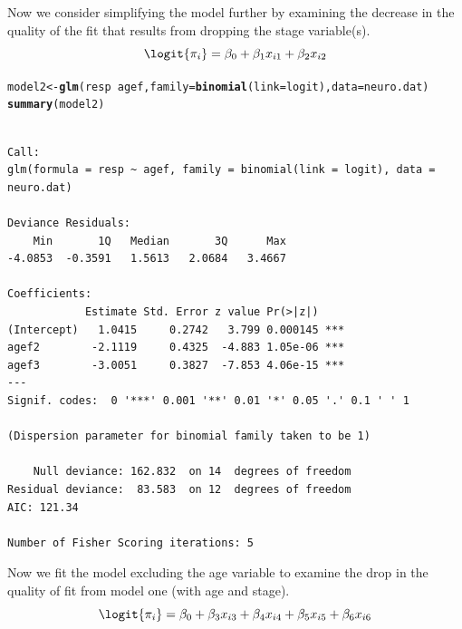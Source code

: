 \documentclass[oneside]{book}\usepackage[]{graphicx}\usepackage[svgnames]{xcolor}
\makeatletter
\newcommand{\hlopt}[1]{\textcolor[rgb]{0,0,0}{#1}}%
\newcommand{\hlstd}[1]{\textcolor[rgb]{0.345,0.345,0.345}{#1}}%
\newcommand{\hlkwb}[1]{\textcolor[rgb]{0.69,0.353,0.396}{#1}}%
\newcommand{\hlkwc}[1]{\textcolor[rgb]{0.333,0.667,0.333}{#1}}%
\newcommand{\hlkwd}[1]{\textcolor[rgb]{0.737,0.353,0.396}{\textbf{#1}}}%
\newenvironment{kframe}{%
 \def\at@end@of@kframe{}%
 \ifinner\ifhmode%
  \def\at@end@of@kframe{\end{minipage}}%
  \begin{minipage}{\columnwidth}%
 \fi\fi%
 \def\FrameCommand##1{\hskip\@totalleftmargin \hskip-\fboxsep
 \colorbox{shadecolor}{##1}\hskip-\fboxsep
     \hskip-\linewidth \hskip-\@totalleftmargin \hskip\columnwidth}%
 \MakeFramed {\advance\hsize-\width
   \@totalleftmargin\z@ \linewidth\hsize
   \@setminipage}}%
 {\par\unskip\endMakeFramed%
 \at@end@of@kframe}
\newenvironment{knitrout}{}{} %
\makeatother
\begin{document}
Now we consider simplifying the model further by examining the decrease in the quality
of the fit that results from dropping the stage variable(s).
\[ \logit{\pi_i}=\beta_0+\beta_1x_{i1}+\beta_2x_{i2} \]
\begin{knitrout}
\color{fgcolor}\begin{kframe}
\begin{alltt}
\hlstd{model2} \hlkwb{<-} \hlkwd{glm}\hlstd{(resp} \hlopt{~} \hlstd{agef,} \hlkwc{family} \hlstd{=} \hlkwd{binomial}\hlstd{(}\hlkwc{link} \hlstd{= logit),} \hlkwc{data} \hlstd{= neuro.dat)}
\hlkwd{summary}\hlstd{(model2)}
\end{alltt}
\begin{verbatim}

Call:
glm(formula = resp ~ agef, family = binomial(link = logit), data = neuro.dat)

Deviance Residuals: 
    Min       1Q   Median       3Q      Max  
-4.0853  -0.3591   1.5613   2.0684   3.4667  

Coefficients:
            Estimate Std. Error z value Pr(>|z|)    
(Intercept)   1.0415     0.2742   3.799 0.000145 ***
agef2        -2.1119     0.4325  -4.883 1.05e-06 ***
agef3        -3.0051     0.3827  -7.853 4.06e-15 ***
---
Signif. codes:  0 '***' 0.001 '**' 0.01 '*' 0.05 '.' 0.1 ' ' 1

(Dispersion parameter for binomial family taken to be 1)

    Null deviance: 162.832  on 14  degrees of freedom
Residual deviance:  83.583  on 12  degrees of freedom
AIC: 121.34

Number of Fisher Scoring iterations: 5
\end{verbatim}
\end{kframe}
\end{knitrout}
Now we fit the model excluding the age variable to examine the drop in the quality of
fit from model one (with age and stage).
\[ \logit{\pi_i}=\beta_0+\beta_3x_{i3}+\beta_4x_{i4}+\beta_5x_{i5}+\beta_6x_{i6} \]
\end{document}
